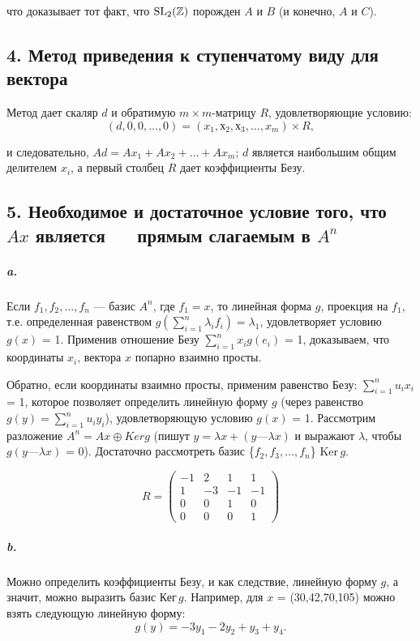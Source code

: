 {\noindent что доказывает тот факт, что $\rm{SL_{2}}(\mathbb{Z})$ порожден $A$ и $B$ (и конечно, $A$ и $C$).

\subsection{\normalsize{4. Метод приведения к ступенчатому виду для вектора}}

Метод дает скаляр $d$ и обратимую $m \times m$-матрицу $R$, удовлетворяющие условию:
\begin{equation*}
(d,0,0,\ldots,0) = (x_1,х_2,х_3,\ldots,x_m) \times R,
\end{equation*}

\noindent и следовательно, $Ad = Ax_1 + Ax_2 +\ldots+ Ax_{m}$; $d$ является наибольшим общим делителем $x_{i}$, а первый столбец $R$ дает коэффициенты Безу.

\subsection{\normalsize{5. Необходимое и достаточное условие того, что $Ax$ является $\;\;\;\;$
прямым слагаемым в $A^{n}$}}

\subparagraph{a.} Если $f_1,f_2,\ldots,f_n$ --- базис $A^{n}$, где $f_1 = x$, то линейная форма $g$, проекция на $f_1$, т.е. определенная равенством $g(\sum_{i=1}^{n} \lambda_{i}f_{i}) = \lambda_{1}$, удовлетворяет условию $g(x)$ = 1. Применив отношение Безу $\sum_{i=1}^{n} x_{i}g(e_{i})$ = 1, доказываем, что координаты $x_i$, вектора $x$ попарно взаимно просты.

Обратно, если координаты взаимно просты, применим равенство Безу: $\sum_{i=1}^{n} u_{i}x_{i}$ = 1, которое позволяет определить линейную форму $g$ (через равенство $g(y) = \sum_{i=1}^{n} u_{i}y_{i}$), удовлетворяющую условию $g(x)$ = 1. Рассмотрим разложение $A^n = Ax \oplus Ker{g}$ (пишут $y = \lambda{x} + (y — \lambda{x})$ и выражают $\lambda$, чтобы $g(y — \lambda{x})$ = 0). Достаточно рассмотреть базис \{$f_2,f_3,\ldots,f_n$\} Ker\,{$g$}.
\begin{wrapfigure}{r}{5cm}
\begin{equation*}
R = \begin{pmatrix} -1 & 2 & 1 & 1 \\ 1 & -3 & -1 & -1 \\ 0 & 0 & 1 & 0 \\ 0 & 0 & 0 & 1 \end{pmatrix}
\end{equation*}
\end{wrapfigure}
\subparagraph{b.} Можно определить коэффициенты
Безу, и как следствие, линейную форму $g$,
а значит, можно выразить базис Кег\,{$g$}. Например, для $x$ = (30,42,70,105) можно
взять следующую линейную форму:
\begin{equation*}
g(y) = -3y_1 - 2y_2 + y_3 + y_4.
\end{equation*}

}
